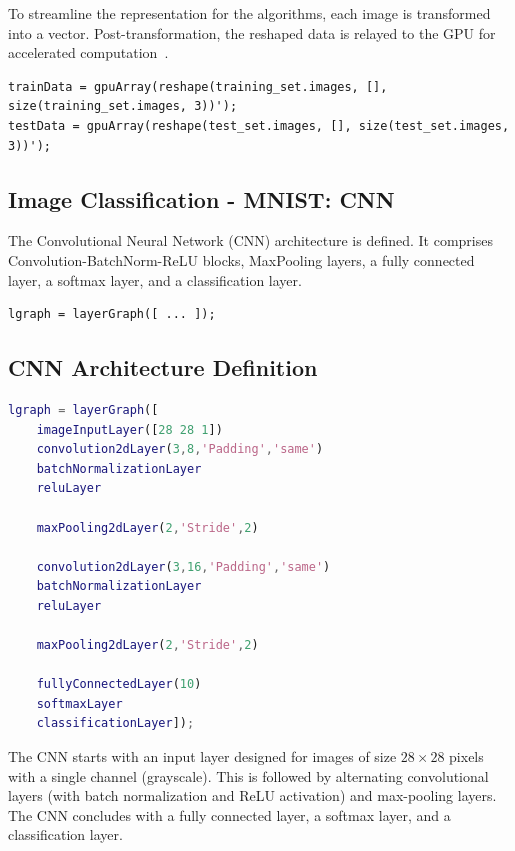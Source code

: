 To streamline the representation for the algorithms, each image is transformed into a vector. Post-transformation, the reshaped data is relayed to the GPU for accelerated computation~\cite{matlabparallel}.
\begin{lstlisting}[style=Matlab-editor]
trainData = gpuArray(reshape(training_set.images, [], size(training_set.images, 3))');
testData = gpuArray(reshape(test_set.images, [], size(test_set.images, 3))');
\end{lstlisting}

\subsection{Image Classification - MNIST: CNN}

The Convolutional Neural Network (CNN) architecture is defined. It comprises Convolution-BatchNorm-ReLU blocks, MaxPooling layers, a fully connected layer, a softmax layer, and a classification layer.

\begin{lstlisting}[style=Matlab-editor]
lgraph = layerGraph([ ... ]);
\end{lstlisting}

\subsection{CNN Architecture Definition}

\begin{lstlisting}[language=Matlab]
%% Define CNN architecture using layerGraph
lgraph = layerGraph([
    imageInputLayer([28 28 1])
    convolution2dLayer(3,8,'Padding','same')
    batchNormalizationLayer
    reluLayer
    
    maxPooling2dLayer(2,'Stride',2)
    
    convolution2dLayer(3,16,'Padding','same')
    batchNormalizationLayer
    reluLayer
    
    maxPooling2dLayer(2,'Stride',2)
    
    fullyConnectedLayer(10)
    softmaxLayer
    classificationLayer]);
\end{lstlisting}

The CNN starts with an input layer designed for images of size \(28 \times 28\) pixels with a single channel (grayscale). This is followed by alternating convolutional layers (with batch normalization and ReLU activation) and max-pooling layers. The CNN concludes with a fully connected layer, a softmax layer, and a classification layer\cite{ciresan2012multi}.
